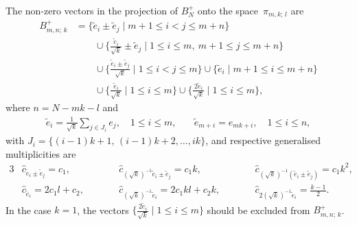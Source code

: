 \documentclass[12pt]{amsart}
\numberwithin{equation}{section}
\theoremstyle{definition}
\begin{document}
The non-zero vectors in the projection of $B_N^+$ onto the space~$\pi_{m,k; \, l}$ are 
\begin{align}
        B_{m,n; \, k}^+ &= \{\widetilde{e}_i \pm \widetilde{e}_j \mid m+1 \leq i < j \leq m+n \} \label{projroot} \\
        &\qquad \cup \{\tfrac{\widetilde{e}_i}{\sqrt{k}} \pm \widetilde{e}_j \mid 1 \leq i \leq m, \ m+1 \leq j \leq m+n\} \nonumber
        \\ 
        &\qquad \cup\{\tfrac{\widetilde{e}_i \pm \widetilde{e}_j}{\sqrt{k}} \mid 1 \leq i < j \leq m \} \cup \{\widetilde{e}_i \mid m+1 \leq i \leq m+n \} \nonumber
        \\
        &\qquad \cup\{\tfrac{\widetilde{e}_i}{\sqrt{k}} \mid 1 \leq i \leq m\} \cup \{\tfrac{2 \widetilde{e}_i}{\sqrt{k}} \mid 1 \leq i \leq m \}, \nonumber
\end{align}
where $n = N - mk - l$ and 
\begin{equation*}
    \begin{array}{cc}
        \widetilde{e}_{i} = \frac{1}{\sqrt{k}}\sum\limits_{j \in J_{i}} e_j, \quad 1 \leq i \leq m,
        & \quad  \widetilde{e}_{m+i} = e_{mk+i}, \quad 1 \leq i \leq n,
    \end{array}
\end{equation*}
with $J_i = \{(i-1)k + 1, \, (i-1)k + 2, \dots, ik \}$, and respective generalised multiplicities are 
\begin{alignat*}{3}
    &\widehat{c}_{\widetilde{e}_i \pm \widetilde{e}_j} = c_1, \qquad 
    &&\widehat{c}_{(\sqrt{k})^{-1}\widetilde{e}_i \pm \widetilde{e}_j} = c_1 k, \qquad 
    &&\widehat{c}_{(\sqrt{k})^{-1}(\widetilde{e}_i \pm \widetilde{e}_j)} = c_1 k^2, \\
    &\widehat{c}_{\widetilde{e}_i} = 2c_1 l + c_2, \qquad 
    &&\widehat{c}_{(\sqrt{k})^{-1}\widetilde{e}_i} = 2c_1 kl + c_2 k, \qquad
    &&\widehat{c}_{2(\sqrt{k})^{-1}\widetilde{e}_i} = \frac{k-1}{2}. 
\end{alignat*}
In the case $k=1$, the vectors $\{\tfrac{2 \widetilde{e}_i}{\sqrt{k}} \mid 1 \leq i \leq m \}$ should be excluded from $B_{m,n; \, k}^+$.


\end{document}
